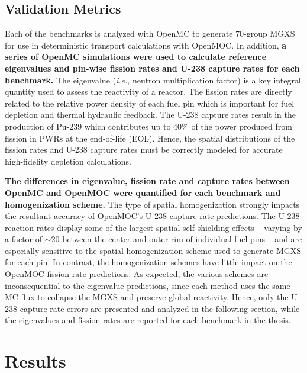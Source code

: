 \documentclass[12pt,twoside]{mitthesis-exec}
\begin{document}
\subsection*{Validation Metrics}

Each of the benchmarks is analyzed with OpenMC to generate 70-group MGXS for use in deterministic transport calculations with OpenMOC. In addition, \textbf{a series of OpenMC simulations were used to calculate reference eigenvalues and pin-wise fission rates and U-238 capture rates for each benchmark.} The eigenvalue (\textit{i.e.}, neutron multiplication factor) is a key integral quantity used to assess the reactivity of a reactor. The fission rates are directly related to the relative power density of each fuel pin which is important for fuel depletion and thermal hydraulic feedback. The U-238 capture rates result in the production of Pu-239 which contributes up to 40\% of the power produced from fission in PWRs at the end-of-life (EOL). Hence, the spatial distributions of the fission rates and U-238 capture rates must be correctly modeled for accurate high-fidelity depletion calculations. 

\textbf{The differences in eigenvalue, fission rate and capture rates between OpenMC and OpenMOC were quantified for each benchmark and homogenization scheme.} The type of spatial homogenization strongly impacts the resultant accuracy of OpenMOC's U-238 capture rate predictions. The U-238 reaction rates display some of the largest spatial self-shielding effects -- varying by a factor of $\sim$20 between the center and outer rim of individual fuel pins -- and are especially sensitive to the spatial homogenization scheme used to generate MGXS for each pin. In contrast, the homogenization schemes have little impact on the OpenMOC fission rate predictions. As expected, the various schemes are inconsequential to the eigenvalue predictions, since each method uses the same MC flux to collapse the MGXS and preserve global reactivity. Hence, only the U-238 capture rate errors are presented and analyzed in the following section, while the eigenvalues and fission rates are reported for each benchmark in the thesis.


\section*{Results}
\end{document}
